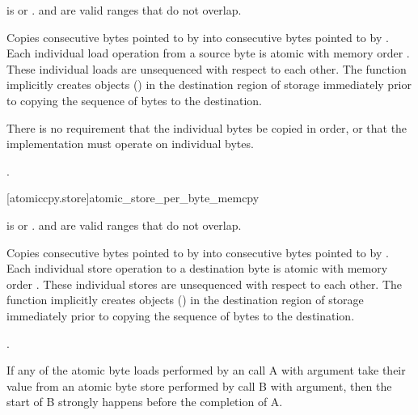 \begin{itemdescr}
\pnum
\expects

 is  or
. \tcode{(char*)dest + [0, count)}
and \tcode{(const char*)source + [0, count)} are valid ranges
that do not overlap.

\pnum
\effects
Copies  consecutive bytes pointed to by
 into consecutive bytes pointed to by . Each
individual load operation from a source byte is atomic with memory order
. These individual loads are unsequenced with respect to
each other. The function implicitly creates objects ()
in the destination region of storage immediately prior to copying the
sequence of bytes to the destination. 
\begin{note} There is no requirement
that the individual bytes be copied in order, or that the implementation
must operate on individual bytes. \end{note}

\pnum
\returns
{}.
\end{itemdescr}

[atomiccpy.store]{atomic_store_per_byte_memcpy}
\textbf{}

\begin{itemdescr}
\pnum
\expects
{} is  or
. \tcode{(char*)dest + [0, count)}
and \tcode{(const char*)source + [0, count)} are valid ranges
that do not overlap.

\pnum
\effects
Copies  consecutive bytes pointed to by
 into consecutive bytes pointed to by . Each
individual store operation to a destination byte is atomic with memory
order . These individual stores are unsequenced with
respect to each other. The function implicitly creates objects
() in the destination region of storage immediately
prior to copying the sequence of bytes to the destination.

\pnum
\returns

.
\end{itemdescr}

\begin{note} If any of the atomic byte loads performed by an
 call A with
 argument take their value from an atomic
byte store performed by  call
B with  argument, then the start of B
strongly happens before the completion of A. 
\end{note}  
